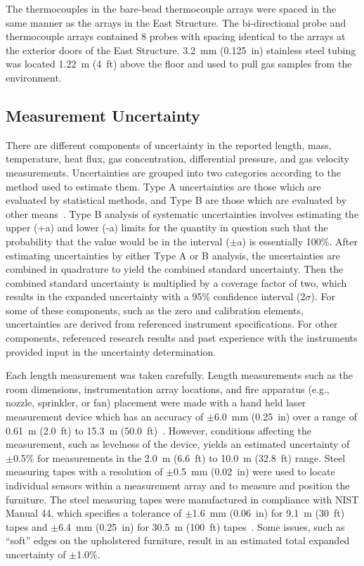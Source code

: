 \documentclass[12pt,oneside]{book}
\begin{document}
The thermocouples in the bare-bead thermocouple arrays were spaced in the same manner as the arrays in the East Structure. The bi-directional probe and thermocouple arrays contained 8 probes with spacing identical to the arrays at the exterior doors of the East Structure. 3.2~mm (0.125~in) stainless steel tubing was located 1.22~m (4~ft) above the floor and used to pull gas samples from the environment. 
\FloatBarrier

\subsection{Measurement Uncertainty}
\label{sec:Uncertainty}
There are different components of uncertainty in the reported length, mass, temperature, heat flux, gas concentration, differential pressure, and gas velocity measurements. Uncertainties are grouped into two categories according to the method used to estimate them. Type A uncertainties are those which are evaluated by statistical methods, and Type B are those which are evaluated by other means~\cite{Taylor&Kuyatt:1994}. Type B analysis of systematic uncertainties involves estimating the upper (+a) and lower (-a) limits for the quantity in question such that the probability that the value would be in the interval ($\pm$a) is essentially 100\%. After estimating uncertainties by either Type A or B analysis, the uncertainties are combined in quadrature to yield the combined standard uncertainty. Then the combined standard uncertainty is multiplied by a coverage factor of two, which results in the expanded uncertainty with a 95\% confidence interval (2$\sigma$). For some of these components, such as the zero and calibration elements, uncertainties are derived from referenced instrument specifications. For other components, referenced research results and past experience with the instruments provided input in the uncertainty determination.

Each length measurement was taken carefully. Length measurements such as the room dimensions, instrumentation array locations, and fire apparatus (e.g., nozzle, sprinkler, or fan) placement were made with a hand held laser measurement device which has an accuracy of $\pm$6.0~mm (0.25~in) over a range of 0.61~m (2.0~ft) to 15.3~m (50.0~ft)~\cite{StanleyTools}. However, conditions affecting the measurement, such as levelness of the device, yields an estimated uncertainty of $\pm$0.5\% for measurements in the 2.0~m (6.6~ft) to 10.0~m (32.8~ft) range. Steel measuring tapes with a resolution of $\pm$0.5~mm (0.02~in) were used to locate individual sensors within a measurement array and to measure and position the furniture. The steel measuring tapes were manufactured in compliance with NIST Manual 44, which specifies a tolerance of $\pm$1.6~mm (0.06~in) for 9.1~m (30~ft) tapes and $\pm$6.4~mm (0.25~in) for 30.5~m (100~ft) tapes~\cite{Butcher:2012}. Some issues, such as ``soft'' edges on the upholstered furniture, result in an estimated total expanded uncertainty of $\pm$1.0\%.
\end{document}
